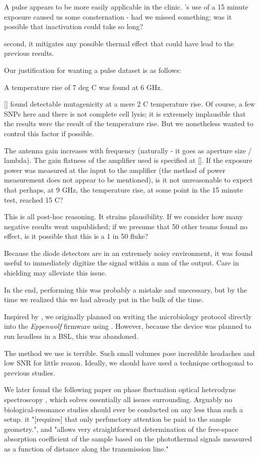 \documentclass[paper.tex]{subfiles}
\begin{document}
A pulse appears to be more easily applicable in the clinic. \cite{Efficient2015}'s use of a 15 minute exposure caused us some consternation
- had we missed something; was it possible that inactivation could take so long?

second, it mitigates any possible thermal effect that could have lead to the previous results.

Our justification for wanting a pulse dataset is as follows:

A temperature rise of 7 deg C was found at 6 GHz.

[] found detectable mutagenicity at a mere 2 C temperature rise.
Of course, a few SNPs here and there is not complete cell lysis; it is extremely implausible that
the results were the result of the temperature rise. But we nonetheless wanted to control this factor if possible.

The antenna gain increases with frequency (naturally - it goes as aperture size / lambda).
The gain flatness of the amplifier used is specified at [].
If the exposure power was measured at the input to the amplifier (the method of power measurement does not appear to be mentioned), is it not
unreasonable to expect that perhaps, at 9 GHz, the temperature rise, at some point in the 15 minute test, reached 15 C?

This is all post-hoc reasoning. It strains plausibility. If we consider how many negative results went unpublished;
if we presume that 50 other teams found no effect, is it possible that this is a 1 in 50 fluke?




Because the diode detectors are in an extremely noisy environment, it was found useful to immediately digitize the signal within a mm of the output. Care in shielding may alleviate this issue.

In the end, performing this was probably a mistake and unecessary, but by the time we realized this we had already put in the bulk of the time.

Inspired by \cite{Biocoder2010}, we originally planned on writing the microbiology protocol directly into the {\it Eppenwolf} firmware using \cite{Noweb}.
However, because the device was planned to run headless in a BSL, this was abandoned.

The method we use is terrible. Such small volumes pose incredible headaches and low SNR for little reason.
Ideally, we should have used a technique orthogonal to previous studies.


We later found the following paper on phase fluctuation optical heterodyne spectroscopy \cite{Broadband1988}, which solves essentially all issues surrounding. Arguably no biological-resonance studies should ever be conducted on any less than such a setup.
it "[requires] that only perfunctory attention be paid to the sample geometry.", and "allows very straightforward determination of the free-space absorption
coefficient of the sample based on the photothermal signals measured as a function of distance along the transmission line."
\end{document}
